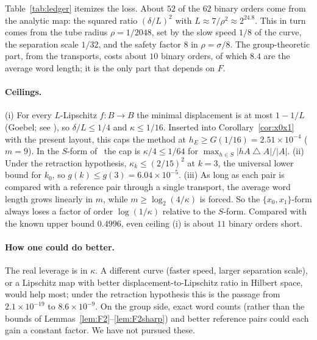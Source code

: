 \documentclass[11pt]{article}
\theoremstyle{definition}
\theoremstyle{remark}
\newcommand{\sd}{\mathbin{\triangle}}
\newcommand{\hE}{h_E}
\begin{document}
Table~\ref{tab:ledger} itemizes the loss. About $52$ of the $62$ binary orders come from the
analytic map: the squared ratio $(\delta/L)^2$ with $L\approx 7/\rho^2\approx2^{24.8}$. This in
turn comes from the tube radius $\rho=1/2048$, set by the slow speed $1/8$ of the curve, the
separation scale $1/32$, and the safety factor $8$ in $\rho=\sigma/8$. The group-theoretic part,
from the transports, costs about $10$ binary orders, of which $8.4$ are the average word length;
it is the only part that depends on $F$.

\paragraph{Ceilings.}
(i) For every $L$-Lipschitz $f:B\to B$ the minimal displacement is at most $1-1/L$ (Goebel; see
\cite{BWW}), so $\delta/L\le1/4$ and $\kappa\le1/16$. Inserted into Corollary~\ref{cor:x0x1}
with the present layout, this caps the method at $\hE\ge G(1/16)=2.51\times10^{-4}$ ($m=9$). In
the $S$-form of~\cite{OAI} the cap is $\kappa/4\le1/64$ for $\max_{h\in S}|hA\sd A|/|A|$.
(ii) Under the retraction hypothesis, $\kappa_k\le(2/15)^2$ at $k=3$, the universal lower bound
for $k_0$, so $g(k)\le g(3)=6.04\times10^{-5}$. (iii) As long as each pair is compared with a
reference pair through a single transport, the average word length grows linearly in $m$, while
$m\ge\log_2(4/\kappa)$ is forced. So the $\{x_0,x_1\}$-form always loses a factor of order
$\log(1/\kappa)$ relative to the $S$-form. Compared with the known upper bound $0.4996$, even
ceiling (i) is about $11$ binary orders short.

\paragraph{How one could do better.}
The real leverage is in $\kappa$. A different curve (faster speed, larger separation scale), or a
Lipschitz map with better displacement-to-Lipschitz ratio in Hilbert space, would help most;
under the retraction hypothesis this is the passage from $2.1\times10^{-19}$ to
$8.6\times10^{-9}$. On the group side, exact word counts (rather than the bounds of
Lemmas~\ref{lem:F2}--\ref{lem:F2sharp}) and better reference pairs could each gain a constant
factor. We have not pursued these.
\end{document}
